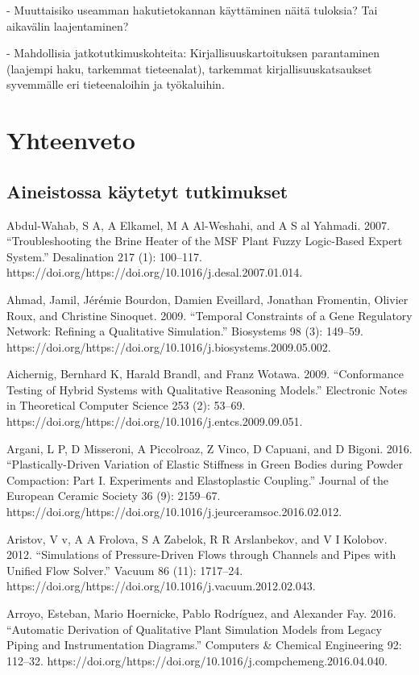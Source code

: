 \documentclass[utf8]{gradu3}
\begin{document}
- Muuttaisiko useamman hakutietokannan käyttäminen näitä tuloksia? Tai aikavälin laajentaminen?

- Mahdollisia jatkotutkimuskohteita: Kirjallisuuskartoituksen parantaminen 
(laajempi haku, tarkemmat tieteenalat), 
tarkemmat kirjallisuuskatsaukset syvemmälle eri tieteenaloihin ja työkaluihin.

\chapter{Yhteenveto}


\printbibliography

\appendix
\section{Aineistossa käytetyt tutkimukset}

Abdul-Wahab, S A, A Elkamel, M A Al-Weshahi, and A S al Yahmadi. 2007. “Troubleshooting the Brine Heater of the MSF Plant Fuzzy Logic-Based Expert System.” Desalination 217 (1): 100–117. https://doi.org/https://doi.org/10.1016/j.desal.2007.01.014.

Ahmad, Jamil, Jérémie Bourdon, Damien Eveillard, Jonathan Fromentin, Olivier Roux, 
and Christine Sinoquet. 2009. 
“Temporal Constraints of a Gene Regulatory Network: 
Refining a Qualitative Simulation.” Biosystems 98 (3): 149–59.
https://doi.org/https://doi.org/10.1016/j.biosystems.2009.05.002.

Aichernig, Bernhard K, Harald Brandl, and Franz Wotawa. 2009. “Conformance Testing of Hybrid Systems with Qualitative Reasoning Models.” Electronic Notes in Theoretical Computer Science 253 (2): 53–69. https://doi.org/https://doi.org/10.1016/j.entcs.2009.09.051.

Argani, L P, D Misseroni, A Piccolroaz, Z Vinco, D Capuani, and D Bigoni. 2016. “Plastically-Driven Variation of Elastic Stiffness in Green Bodies during Powder Compaction: Part I. Experiments and Elastoplastic Coupling.” Journal of the European Ceramic Society 36 (9): 2159–67. https://doi.org/https://doi.org/10.1016/j.jeurceramsoc.2016.02.012.

Aristov, V v, A A Frolova, S A Zabelok, R R Arslanbekov, and V I Kolobov. 2012. “Simulations of Pressure-Driven Flows through Channels and Pipes with Unified Flow Solver.” Vacuum 86 (11): 1717–24. https://doi.org/https://doi.org/10.1016/j.vacuum.2012.02.043.

Arroyo, Esteban, Mario Hoernicke, Pablo Rodríguez, and Alexander Fay. 2016. “Automatic Derivation of Qualitative Plant Simulation Models from Legacy Piping and Instrumentation Diagrams.” Computers \& Chemical Engineering 92: 112–32. https://doi.org/https://doi.org/10.1016/j.compchemeng.2016.04.040.
\end{document}
